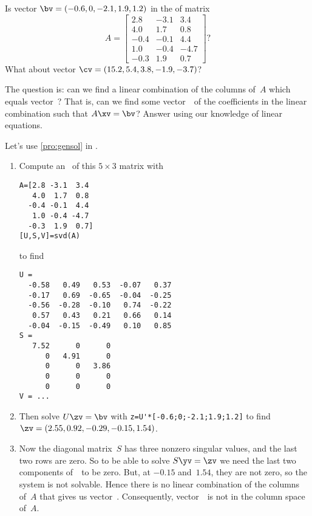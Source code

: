 \begin{example} 
Is vector \(\bv=(-0.6,0,-2.1,1.9,1.2)\) in the  of matrix
\begin{equation*}
A=\begin{bmatrix} 2.8&-3.1&3.4
\\4.0&1.7&0.8
\\-0.4&-0.1&4.4
\\1.0&-0.4&-4.7
\\-0.3&1.9&0.7 \end{bmatrix}?
\end{equation*}
What about vector \(\cv=(15.2,5.4,3.8,-1.9,-3.7)\)?

\begin{solution} 
The question is: can we find a linear combination of the columns of~\(A\) which equals vector~\bv?
That is, can we find some vector~\xv\ of the coefficients in the linear combination such that \(A\xv=\bv\)?
Answer using our knowledge of linear equations.

Let's use \cref{pro:gensol} in \script.
\begin{enumerate}
\item Compute an \svd\  of this \(5\times 3\) matrix with
\begin{verbatim}
A=[2.8 -3.1  3.4
   4.0  1.7  0.8
  -0.4 -0.1  4.4
   1.0 -0.4 -4.7
  -0.3  1.9  0.7]
[U,S,V]=svd(A)
\end{verbatim}
\setbox\ajrqrbox\hbox{}%
\marginajrbox%
to find \twodp
\begin{verbatim}
U =
  -0.58   0.49   0.53  -0.07   0.37
  -0.17   0.69  -0.65  -0.04  -0.25
  -0.56  -0.28  -0.10   0.74  -0.22
   0.57   0.43   0.21   0.66   0.14
  -0.04  -0.15  -0.49   0.10   0.85
S =
   7.52      0      0
      0   4.91      0
      0      0   3.86
      0      0      0
      0      0      0
V = ...
\end{verbatim}

\item Then solve \(U\zv=\bv\) with \verb|z=U'*[-0.6;0;-2.1;1.9;1.2]| to find \twodp\ \(\zv=(2.55,0.92,-0.29,-0.15,1.54)\).

\item Now the diagonal matrix~\(S\) has three nonzero singular values, and the last two rows are zero.
So to be able to solve \(S\yv=\zv\) we need the last two components of~\zv\ to be zero. 
But, at \(-0.15\) and~\(1.54\), they are not zero, so the system is not solvable.
Hence there is no linear combination of the columns of~\(A\) that gives us vector~\bv.
Consequently, vector~\bv\ is not in the column space of~\(A\).


\end{enumerate}
\end{solution}
\end{example}
